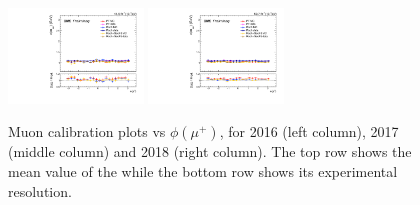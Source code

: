 \begin{figure}[!htb]
      \includegraphics[width=0.32\textwidth]{pics/muon_corr/muon_cal/2017/muP_phi_summary_reso.pdf}
      \includegraphics[width=0.32\textwidth]{pics/muon_corr/muon_cal/2018/muP_phi_summary_reso.pdf}
      \caption{Muon calibration plots vs $\phi(\mu^{+})$, for 2016 (left column), 2017 (middle column) and 2018 (right column).
               The top row shows the mean value of the \mmm while the bottom row shows its experimental resolution.}
      \label{fig:mucal_muP_phi}
\end{figure}


